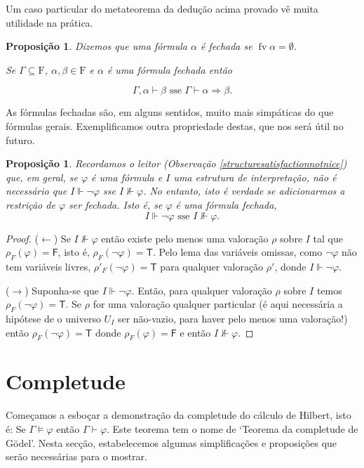 \documentclass{report}
\newtheorem{prop}{Proposição}
\newtheorem*{prop*}{Proposição}
\theoremstyle{definition}
\theoremstyle{remark}
\newcommand{\F}{\mathrm{F}}
\newcommand{\lt}{\mathsf{T}}
\newcommand{\lf}{\mathsf{F}}
\DeclareMathOperator{\fv}{fv}
\newcommand{\imply}{\mathbin{\Rightarrow}}
\begin{document}
	Um caso particular do metateorema da dedução acima provado vê muita utilidade na prática.
	
	\begin{prop*}
	Dizemos que uma fórmula $\alpha$ é \emph{fechada} se $\fv \alpha = \emptyset$.
	
	Se $\Gamma \subseteq \F$, $\alpha, \beta \in \F$ e $\alpha$ é uma fórmula fechada então
	
	\[\Gamma, \alpha \vdash \beta \text{ sse } \Gamma \vdash \alpha \imply \beta.\]
	\end{prop*}
	
	As fórmulas fechadas são, em alguns sentidos, muito mais simpáticas do que fórmulas gerais. Exemplificamos outra propriedade destas, que nos será útil no futuro.
	
	\begin{prop}\label{fol:closednegnvdash}
	Recordamos o leitor (Observação \ref{structuresatisfactionnotnice}) que, em geral, se $\varphi$ é uma fórmula e $I$ uma estrutura de interpretação, não é necessário que $I \Vdash \neg \varphi$ sse $I \nVdash \varphi$. No entanto, isto é verdade se adicionarmos a restrição de $\varphi$ ser fechada. Isto é, se $\varphi$ é uma fórmula fechada,
	\[I \Vdash \neg \varphi \text{ sse } I \nVdash \varphi.\]
	\end{prop}
	
	\begin{proof}
	($\leftarrow$) Se $I \nVdash \varphi$ então existe pelo menos uma valoração $\rho$ sobre $I$ tal que $\rho_F(\varphi) = \lf$, isto é, $\rho_F(\neg \varphi) = \lt$. Pelo lema das variáveis omissas, como $\neg \varphi$ não tem variáveis livres, $\rho'_F(\neg \varphi) = \lt$ para qualquer valoração $\rho'$, donde $I \Vdash \neg \varphi$.
	
	($\rightarrow$) Suponha-se que $I \Vdash \neg \varphi$. Então, para qualquer valoração $\rho$ sobre $I$ temos $\rho_F(\neg \varphi) = \lt$. Se $\rho$ for uma valoração qualquer particular (é aqui necessária a hipótese de o universo $U_I$ ser não-vazio, para haver pelo menos uma valoração!) então $\rho_F(\neg \varphi) = \lt$ donde $\rho_F(\varphi) = \lf$ e então $I \nVdash \varphi$.
	\end{proof}
	
	\section{Completude}
	\setcounter{ideia}{0}
	\setcounter{obstaculo}{0}
	
	Começamos a esboçar a demonstração da completude do cálculo de Hilbert, isto é: Se $\Gamma \vDash \varphi$ então $\Gamma \vdash \varphi$. Este teorema tem o nome de `Teorema da completude de Gödel'. Nesta secção, estabelecemos algumas simplificações e proposições que serão necessárias para o mostrar.
	
\end{document}
